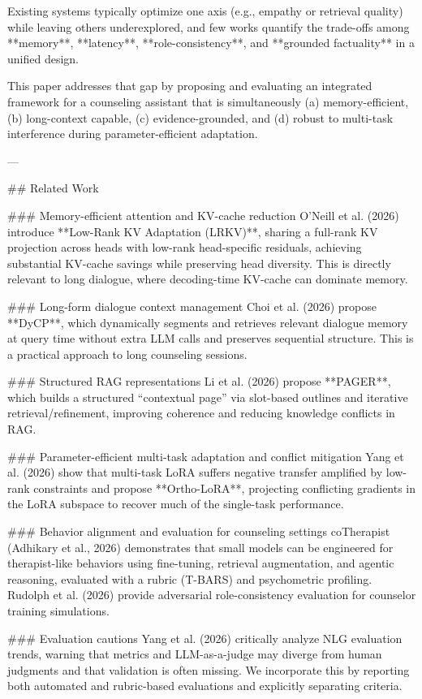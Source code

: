 Existing systems typically optimize one axis (e.g., empathy or retrieval quality) while leaving others underexplored, and few works quantify the trade-offs among **memory**, **latency**, **role-consistency**, and **grounded factuality** in a unified design.

This paper addresses that gap by proposing and evaluating an integrated framework for a counseling assistant that is simultaneously (a) memory-efficient, (b) long-context capable, (c) evidence-grounded, and (d) robust to multi-task interference during parameter-efficient adaptation.

---

## Related Work  

### Memory-efficient attention and KV-cache reduction  
O’Neill et al. (2026) introduce **Low-Rank KV Adaptation (LRKV)**, sharing a full-rank KV projection across heads with low-rank head-specific residuals, achieving substantial KV-cache savings while preserving head diversity. This is directly relevant to long dialogue, where decoding-time KV-cache can dominate memory.

### Long-form dialogue context management  
Choi et al. (2026) propose **DyCP**, which dynamically segments and retrieves relevant dialogue memory at query time without extra LLM calls and preserves sequential structure. This is a practical approach to long counseling sessions.

### Structured RAG representations  
Li et al. (2026) propose **PAGER**, which builds a structured “contextual page” via slot-based outlines and iterative retrieval/refinement, improving coherence and reducing knowledge conflicts in RAG.

### Parameter-efficient multi-task adaptation and conflict mitigation  
Yang et al. (2026) show that multi-task LoRA suffers negative transfer amplified by low-rank constraints and propose **Ortho-LoRA**, projecting conflicting gradients in the LoRA subspace to recover much of the single-task performance.

### Behavior alignment and evaluation for counseling settings  
coTherapist (Adhikary et al., 2026) demonstrates that small models can be engineered for therapist-like behaviors using fine-tuning, retrieval augmentation, and agentic reasoning, evaluated with a rubric (T-BARS) and psychometric profiling. Rudolph et al. (2026) provide adversarial role-consistency evaluation for counselor training simulations.

### Evaluation cautions  
Yang et al. (2026) critically analyze NLG evaluation trends, warning that metrics and LLM-as-a-judge may diverge from human judgments and that validation is often missing. We incorporate this by reporting both automated and rubric-based evaluations and explicitly separating criteria.

